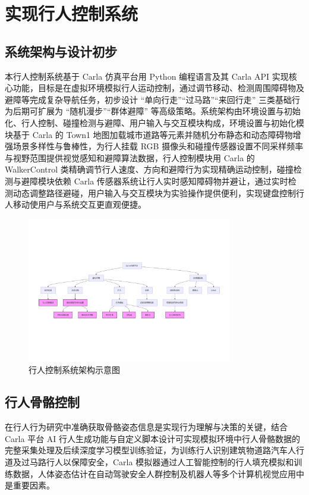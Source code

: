 \chapter{实现行人控制系统}

\section{系统架构与设计初步}
本行人控制系统基于 Carla 仿真平台用 Python 编程语言及其 Carla API 实现核心功能，目标是在虚拟环境模拟行人运动控制，通过调节移动、检测周围障碍物及避障等完成复杂导航任务，初步设计 “单向行走”“过马路”“来回行走” 三类基础行为后期可扩展为 “随机漫步”“群体避障” 等高级策略。系统架构由环境设置与初始化、行人控制、碰撞检测与避障、用户输入与交互模块构成，环境设置与初始化模块基于 Carla 的 Town1 地图加载城市道路等元素并随机分布静态和动态障碍物增强场景多样性与鲁棒性，为行人挂载 RGB 摄像头和碰撞传感器设置不同采样频率与视野范围提供视觉感知和避障算法数据，行人控制模块用 Carla 的 WalkerControl 类精确调节行人速度、方向和避障行为实现精确运动控制，碰撞检测与避障模块依赖 Carla 传感器系统让行人实时感知障碍物并避让，通过实时检测动态调整路径避碰，用户输入与交互模块为实验操作提供便利，实现键盘控制行人移动使用户与系统交互更直观便捷。

\begin{figure}[hbt]
    \centering
    \includegraphics[width=0.8\textwidth]{images/system_architecture.pdf}
    \caption{行人控制系统架构示意图}
    \label{f.system_architecture}
\end{figure}

\section{行人骨骼控制}
在行人行为研究中准确获取骨骼姿态信息是实现行为理解与决策的关键，结合 Carla 平台 AI 行人生成功能与自定义脚本设计可实现模拟环境中行人骨骼数据的完整采集处理及后续深度学习模型训练验证，为训练行人识别建筑物道路汽车人行道及过马路行人以保障安全，Carla 模拟器通过人工智能控制的行人填充模拟和训练数据，人体姿态估计在自动驾驶安全人群控制及机器人等多个计算机视觉应用中是重要因素。

